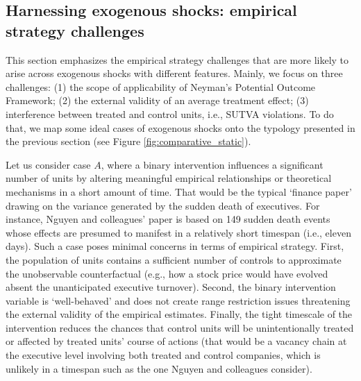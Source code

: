 \documentclass[11pt]{article}
\begin{document}
\begin{refsection}
\section{Harnessing exogenous shocks: empirical strategy challenges}
\label{sec:harnessing_exogenous_shocks}

\noindent This section emphasizes the empirical strategy challenges that are more 
likely to arise across exogenous shocks with different features. Mainly,
we focus on three challenges: (1) the scope of applicability of Neyman's
Potential Outcome Framework; (2) the external validity of an average treatment 
effect; (3) interference between treated and control units, i.e., SUTVA 
violations. To do that, we map some ideal cases of exogenous shocks onto the typology presented in
the previous section (see Figure \ref{fig:comparative_static}).

Let us consider case $A$, where a binary intervention influences a significant
number of units by altering meaningful empirical relationships or theoretical
mechanisms in a short amount of time. That would be the typical `finance paper'
drawing on the variance generated by the sudden death of executives. For
instance, Nguyen and colleagues' \autocite*{nguyen_et_al_2014} paper is based on 149
sudden death events whose effects are presumed to manifest in a relatively short
timespan (i.e., eleven days). Such a case poses minimal concerns in terms of
empirical strategy.  First, the population of units contains a sufficient number of
controls to approximate the unobservable counterfactual (e.g., how a stock price
would have evolved absent the unanticipated executive turnover). Second, the
binary intervention variable is `well-behaved' and does not create range
restriction issues threatening the external validity of the empirical estimates.
Finally, the tight timescale of the intervention reduces the chances that
control units will be unintentionally treated or affected by treated units'
course of actions (that would be a vacancy chain at the executive
level involving both treated and control companies, which is unlikely in a
timespan such as the one Nguyen and colleagues \autocite*{nguyen_et_al_2014}
consider). 


\end{refsection}
\end{document}
